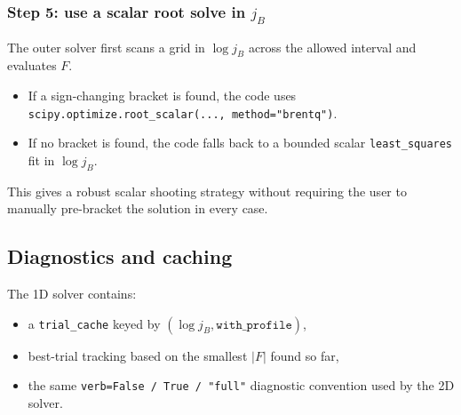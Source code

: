 \documentclass[11pt]{article}
\begin{document}
\subsubsection*{Step 5: use a scalar root solve in $j_B$}
The outer solver first scans a grid in $\log j_B$ across the allowed interval
and evaluates $F$.

\begin{itemize}[leftmargin=1.5em]
\item If a sign-changing bracket is found, the code uses
      \texttt{scipy.optimize.root\_scalar(..., method="brentq")}.
\item If no bracket is found, the code falls back to a bounded scalar
      \texttt{least\_squares} fit in $\log j_B$.
\end{itemize}

This gives a robust scalar shooting strategy without requiring the user to
manually pre-bracket the solution in every case.

\subsection{Diagnostics and caching}
The 1D solver contains:
\begin{itemize}[leftmargin=1.5em]
\item a \texttt{trial\_cache} keyed by $(\log j_B, \texttt{with\_profile})$,
\item best-trial tracking based on the smallest $|F|$ found so far,
\item the same \texttt{verb=False / True / "full"} diagnostic convention used by
the 2D solver.
\end{itemize}
\end{document}
